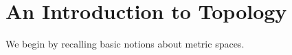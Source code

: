\chapter{An Introduction to Topology} \label{Ch1:CH}
\thispagestyle{empty}

We begin by recalling basic notions about metric spaces.


